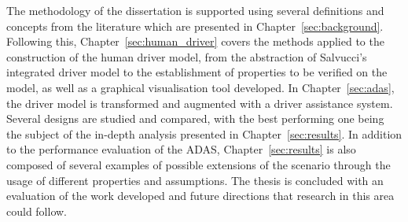 The methodology of the dissertation is supported using several definitions and concepts from the literature which are presented in Chapter~\ref{sec:background}. Following this, Chapter~\ref{sec:human_driver} covers the methods applied to the construction of the human driver model, from the abstraction of Salvucci's integrated driver model to the establishment of properties to be verified on the model, as well as a graphical visualisation tool developed. In Chapter~\ref{sec:adas}, the driver model is transformed and augmented with a driver assistance system. Several designs are studied and compared, with the best performing one being the subject of the in-depth analysis presented in Chapter~\ref{sec:results}. In addition to the performance evaluation of the ADAS, Chapter~\ref{sec:results} is also composed of several examples of possible extensions of the scenario through the usage of different properties and assumptions. The thesis is concluded with an evaluation of the work developed and future directions that research in this area could follow.












